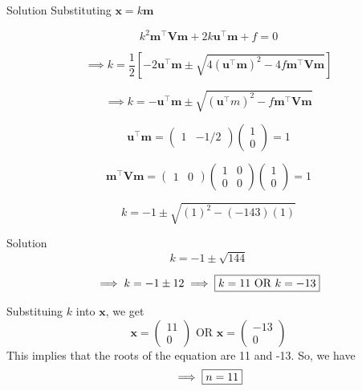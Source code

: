 \documentclass{beamer}
\let\vec\mathbf
\providecommand{\sbrak}[1]{\ensuremath{{}\left[#1\right]}}
\theoremstyle{remark}
\newcommand{\myvec}[1]{\ensuremath{\begin{pmatrix}#1\end{pmatrix}}}
\begin{document}
\begin{frame}{Solution}
Substituting $\vec{x} = k\vec{m}$

\begin{equation}
    k^2\vec{m}^{\top}\vec{V}\vec{m} + 2k\vec{u}^{\top}\vec{m} + f = 0
\end{equation}

\begin{equation}
    \implies k = \frac{1}{2}\sbrak{-2\vec{u}^{\top}\vec{m} \pm \sqrt{4(\vec{u}^{\top}\vec{m})^2 - 4f\vec{m}^{\top}\vec{V}\vec{m}}}
\end{equation}

\begin{equation}
    \implies k = -\vec{u}^{\top}\vec{m} \pm \sqrt{(\vec{u}^{\top}m)^2 - f\vec{m}^{\top}\vec{V}\vec{m}}
\end{equation}

\begin{equation}
    \vec{u}^{\top}\vec{m} = \myvec{1 & -1/2}\myvec{1\\0} = 1
\end{equation}

\begin{equation}
    \vec{m}^{\top}\vec{V}\vec{m} = \myvec{1&0}\myvec{1&0\\0&0}\myvec{1\\0} = 1
\end{equation}

\begin{equation}
    k = -1 \pm \sqrt{(1)^2 - (-143)(1)}
\end{equation}
\end{frame}

\begin{frame}{Solution}
\begin{equation}
    k = -1 \pm \sqrt{144}
\end{equation}

\begin{equation}
    \implies k = -1 \pm 12 \implies \fbox{$k = 11 \text{ OR } k = -13$}
\end{equation}

Substituing $k$ into $\vec{x}$, we get
\begin{equation}
    \vec{x} = \myvec{11\\0} \text{ OR } \vec{x} = \myvec{-13\\0}
\end{equation}
This implies that the roots of the equation are 11 and -13.
So, we have
\begin{equation}
    \implies \fbox{$n = 11$}
\end{equation}
\end{frame}
\end{document}
